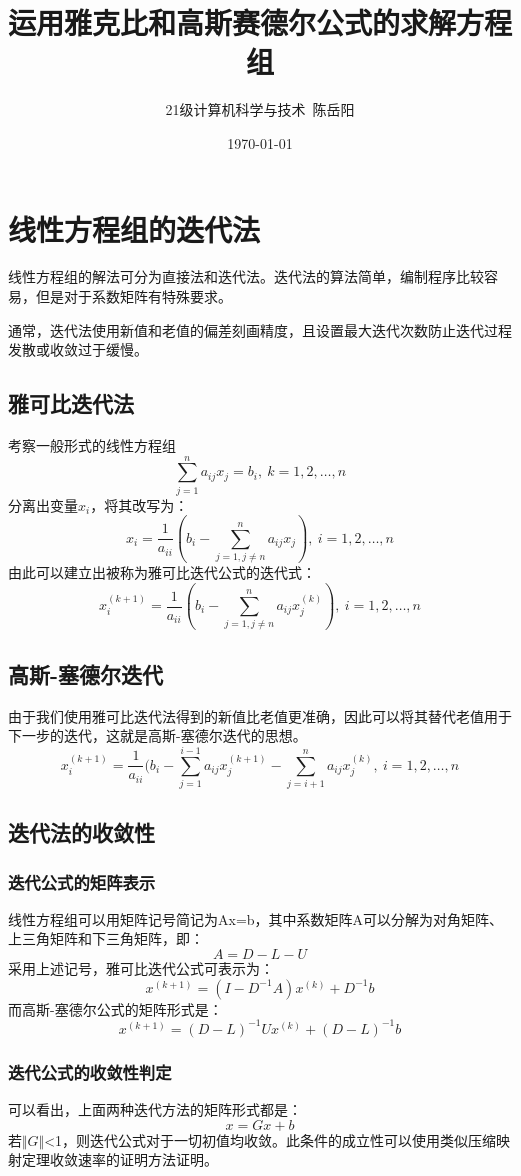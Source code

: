 \documentclass{article}
\title{运用雅克比和高斯赛德尔公式的求解方程组}
\author{21级计算机科学与技术\ 陈岳阳}
\date{\today}
\begin{document}
\maketitle
\tableofcontents

\section{线性方程组的迭代法}
	线性方程组的解法可分为直接法和迭代法。迭代法的算法简单，编制程序比较容易，但是对于系数矩阵有特殊要求。

	通常，迭代法使用新值和老值的偏差刻画精度，且设置最大迭代次数防止迭代过程发散或收敛过于缓慢。
  \subsection{雅可比迭代法}
	考察一般形式的线性方程组
$$
\sum\limits^n_{j=1}a_{ij}x_j=b_i,\ k=1,2,\dots,n
$$
	分离出变量$x_i$，将其改写为：
$$
x_i=\frac{1}{a_{ii}}(b_i-\sum\limits^n_{j=1,j\neq n}a_{ij}x_j),\ i=1,2,\dots,n
$$
	由此可以建立出被称为雅可比迭代公式的迭代式：
$$
x^{(k+1)}_i=\frac{1}{a_{ii}}(b_i-\sum\limits^n_{j=1,j\neq n}a_{ij}x^{(k)}_j),\ i=1,2,\dots,n
$$
    \subsection{高斯-塞德尔迭代}
	由于我们使用雅可比迭代法得到的新值比老值更准确，因此可以将其替代老值用于下一步的迭代，这就是高斯-塞德尔迭代的思想。
$$
	x^{(k+1)}_i=\frac{1}{a_{ii}}(b_i-\sum\limits_{j=1}^{i-1}a_{ij}x_j^{(k+1)}-\sum\limits^n_{j=i+1}a_{ij}x_j^{(k)},\ i=1,2,\dots,n
$$

	\subsection{迭代法的收敛性}
		\subsubsection{迭代公式的矩阵表示}
	线性方程组可以用矩阵记号简记为Ax=b，其中系数矩阵A可以分解为对角矩阵、上三角矩阵和下三角矩阵，即：
$$
	A=D-L-U
$$
	采用上述记号，雅可比迭代公式可表示为：
$$
x^{(k+1)}=(I-D^{-1}A)x^{(k)}+D^{-1}b
$$
	而高斯-塞德尔公式的矩阵形式是：
$$
x^{(k+1)}=(D-L)^{-1}Ux^{(k)}+(D-L)^{-1}b
$$
	
		\subsubsection{迭代公式的收敛性判定}
	可以看出，上面两种迭代方法的矩阵形式都是：
$$
x=Gx+b
$$
若$\Vert G\Vert$<1，则迭代公式对于一切初值均收敛。此条件的成立性可以使用类似压缩映射定理收敛速率的证明方法证明。
\end{document}
